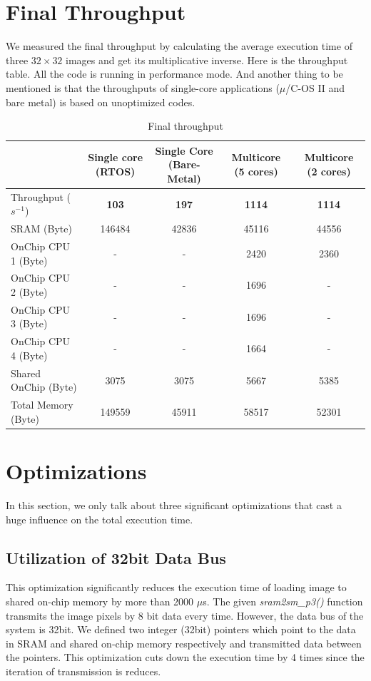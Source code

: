 \documentclass[conference]{IEEEtran}
\begin{document}
\section{Final Throughput}
We measured the final throughput by calculating the average execution time of three $32\times32$ images and get its multiplicative inverse. Here is the throughput table. All the code is running in performance mode. And another thing to be mentioned is that the throughputs of single-core applications ($\mu$/C-OS II and bare metal) is based on unoptimized codes.
\begin{table}
	\centering
	\caption{Final throughput}
	\label{tab:Throughput}
	\begin{tabular}{l|cccc}
		\toprule
		&Single core (RTOS)&Single Core (Bare-Metal)&Multicore (5 cores)&Multicore (2 cores)\\
		\midrule
		Throughput ($s^{-1}$)&\textbf{103}&\textbf{197}&\textbf{1114}&\textbf{1114}\\	
		SRAM (Byte)&146484&42836&45116&44556\\
		OnChip CPU 1 (Byte)&-&-&2420&2360\\
		OnChip CPU 2 (Byte)&-&-&1696&-\\
		OnChip CPU 3 (Byte)&-&-&1696&-\\
		OnChip CPU 4 (Byte)&-&-&1664&-\\
		Shared OnChip (Byte)&3075&3075&5667&5385\\
		Total Memory (Byte)&149559&45911&58517&52301\\
		\bottomrule
	\end{tabular}
\end{table}

\section{Optimizations}
In this section, we only talk about three significant optimizations that cast a huge influence on the total execution time.
\subsection{Utilization of 32bit Data Bus}
This optimization significantly reduces the execution time of loading image to shared on-chip memory by more than 2000 $\mu$s. The given \emph{sram2sm\_p3()} function transmits the image pixels by 8 bit data every time. However, the data bus of the system is 32bit. We defined two integer (32bit) pointers which point to the data in SRAM and shared on-chip memory respectively and transmitted data between the pointers. This optimization cuts down the execution time by 4 times since the iteration of transmission is reduces.
\end{document}
